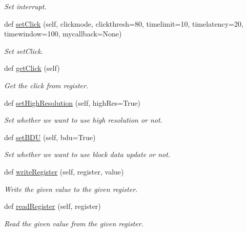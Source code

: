 \begin{DoxyCompactItemize}
\begin{DoxyCompactList}\small\item\em Set interrupt. \end{DoxyCompactList}\item 
def \mbox{\hyperlink{classlis3dh_1_1_l_i_s3_d_h_a1780dbfc94a02069a7c8299c6e157edd}{set\+Click}} (self, clickmode, clickthresh=80, timelimit=10, timelatency=20, timewindow=100, mycallback=None)
\begin{DoxyCompactList}\small\item\em Set set\+Click. \end{DoxyCompactList}\item 
def \mbox{\hyperlink{classlis3dh_1_1_l_i_s3_d_h_ae43358edd3cd47f8d6df25f01b8a3cf2}{get\+Click}} (self)
\begin{DoxyCompactList}\small\item\em Get the click from register. \end{DoxyCompactList}\item 
def \mbox{\hyperlink{classlis3dh_1_1_l_i_s3_d_h_adbea6144297062f1566f660133e372d8}{set\+High\+Resolution}} (self, high\+Res=True)
\begin{DoxyCompactList}\small\item\em Set whether we want to use high resolution or not. \end{DoxyCompactList}\item 
def \mbox{\hyperlink{classlis3dh_1_1_l_i_s3_d_h_a47e60af7fb47c9448ead9560e56301a8}{set\+B\+DU}} (self, bdu=True)
\begin{DoxyCompactList}\small\item\em Set whether we want to use block data update or not. \end{DoxyCompactList}\item 
def \mbox{\hyperlink{classlis3dh_1_1_l_i_s3_d_h_ad240efbeee72b620399ba8ae8016bcd5}{write\+Register}} (self, register, value)
\begin{DoxyCompactList}\small\item\em Write the given value to the given register. \end{DoxyCompactList}\item 
def \mbox{\hyperlink{classlis3dh_1_1_l_i_s3_d_h_a5befd55648de38dcd3d0a3b576b88e34}{read\+Register}} (self, register)
\begin{DoxyCompactList}\small\item\em Read the given value from the given register. \end{DoxyCompactList}\item 

\end{DoxyCompactItemize}
